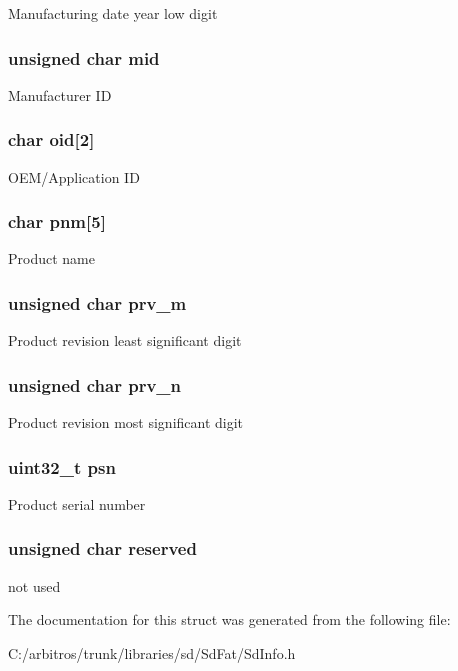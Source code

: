 Manufacturing date year low digit \hypertarget{struct_c_i_d_ae7e18f9a317db7063e35ef5a5d4bd5f7}{
\subsubsection[{mid}]{\setlength{\rightskip}{0pt plus 5cm}unsigned char mid}}\label{struct_c_i_d_ae7e18f9a317db7063e35ef5a5d4bd5f7}
Manufacturer I\-D \hypertarget{struct_c_i_d_a0e7c3c74464b5888d6e4dde057c4d2c9}{
\subsubsection[{oid}]{\setlength{\rightskip}{0pt plus 5cm}char oid\mbox{[}2\mbox{]}}}\label{struct_c_i_d_a0e7c3c74464b5888d6e4dde057c4d2c9}
O\-E\-M/\-Application I\-D \hypertarget{struct_c_i_d_a44c58f891140614a2a6a1ad573ca0bf3}{
\subsubsection[{pnm}]{\setlength{\rightskip}{0pt plus 5cm}char pnm\mbox{[}5\mbox{]}}}\label{struct_c_i_d_a44c58f891140614a2a6a1ad573ca0bf3}
Product name \hypertarget{struct_c_i_d_a4db87c2ec4c352612dcf8cedf9986d8e}{
\subsubsection[{prv\-\_\-m}]{\setlength{\rightskip}{0pt plus 5cm}unsigned char prv\-\_\-m}}\label{struct_c_i_d_a4db87c2ec4c352612dcf8cedf9986d8e}
Product revision least significant digit \hypertarget{struct_c_i_d_a1cb6a1abc2649d20b1f2e57dd1763997}{
\subsubsection[{prv\-\_\-n}]{\setlength{\rightskip}{0pt plus 5cm}unsigned char prv\-\_\-n}}\label{struct_c_i_d_a1cb6a1abc2649d20b1f2e57dd1763997}
Product revision most significant digit \hypertarget{struct_c_i_d_ab39d64e654c57f0bc30ce636e071713a}{
\subsubsection[{psn}]{\setlength{\rightskip}{0pt plus 5cm}uint32\-\_\-t psn}}\label{struct_c_i_d_ab39d64e654c57f0bc30ce636e071713a}
Product serial number \hypertarget{struct_c_i_d_ad828f5fe7507f2e5a9df0da7a74b59e8}{
\subsubsection[{reserved}]{\setlength{\rightskip}{0pt plus 5cm}unsigned char reserved}}\label{struct_c_i_d_ad828f5fe7507f2e5a9df0da7a74b59e8}
not used 

The documentation for this struct was generated from the following file\-:\begin{DoxyCompactItemize}
\item 
C\-:/arbitros/trunk/libraries/sd/\-Sd\-Fat/Sd\-Info.\-h\end{DoxyCompactItemize}
